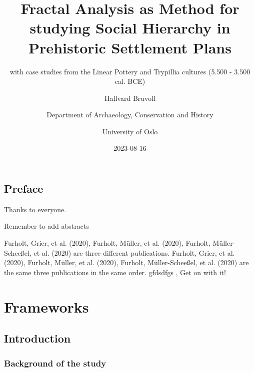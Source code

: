 \documentclass[
  12pt,
]{book}
\title{Fractal Analysis as Method for studying Social Hierarchy in Prehistoric Settlement Plans}
\subtitle{with case studies from the Linear Pottery and Trypillia cultures (5.500 - 3.500 cal. BCE)}
\author{Hallvard Bruvoll \and Department of Archaeology, Conservation and History \and University of Oslo}
\date{2023-08-16}
\begin{document}
\maketitle

{
\setcounter{tocdepth}{2}
\tableofcontents
}
\hypertarget{preface}{%
\chapter*{Preface}\label{preface}}

Thanks to everyone.

Remember to add abstracts

Furholt, Grier, et al. (2020), Furholt, Müller, et al. (2020), Furholt, Müller-Scheeßel, et al. (2020) are three different publications. Furholt, Grier, et al. (2020), Furholt, Müller, et al. (2020), Furholt, Müller-Scheeßel, et al. (2020) are the same three publications in the same order. gfdsdfgs , Get on with it!

\hypertarget{part-frameworks}{%
\part{Frameworks}\label{part-frameworks}}

\hypertarget{intro}{%
\chapter{Introduction}\label{intro}}

\hypertarget{background-of-the-study}{%
\section{Background of the study}\label{background-of-the-study}}
\end{document}
